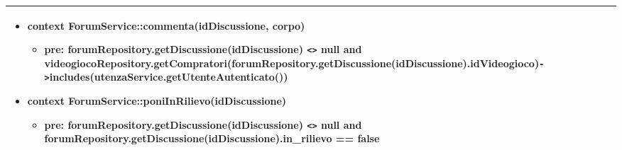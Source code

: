 \begin{tabular}{|| l | p{28em} ||}
\begin{itemize}[leftmargin=*]
		\item \textbf{context} ForumService::commenta(idDiscussione, corpo)
		\begin{itemize}
			\item[ ] \textbf{pre:} forumRepository.getDiscussione(idDiscussione) \verb|<>| null and videogiocoRepository\newline .getCompratori(forumRepository\newline .getDiscussione(idDiscussione).idVideogioco)\verb|->|includes(\newline utenzaService.getUtenteAutenticato())
		\end{itemize}

		\item \textbf{context} ForumService::poniInRilievo(idDiscussione)
		\begin{itemize}
			\item[ ] \textbf{pre:} forumRepository.getDiscussione(idDiscussione) \verb|<>| null and forumRepository.getDiscussione(idDiscussione).in\_rilievo == false
		\end{itemize}
	\end{itemize}\\
	\hline
\end{tabular}

